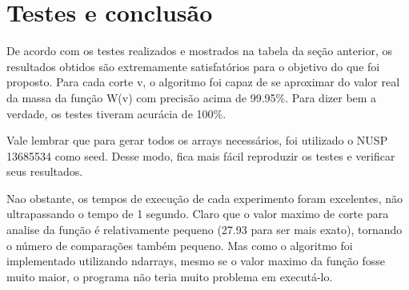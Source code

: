\documentclass{article}
\begin{document}
    \section{Testes e conclusão}

    De acordo com os testes realizados e mostrados na tabela da seção anterior, os resultados obtidos são extremamente satisfatórios para o objetivo do que foi proposto. Para cada corte v, o algoritmo foi capaz de se aproximar do valor real da massa da função W(v) com precisão acima de 99.95\%. Para dizer bem a verdade, os testes tiveram acurácia de 100\%.

    Vale lembrar que para gerar todos os arrays necessários, foi utilizado o NUSP 13685534 como seed. Desse modo, fica mais fácil reproduzir os testes e verificar seus resultados.

    Nao obstante, os tempos de execução de cada experimento foram excelentes, não ultrapassando o tempo de 1 segundo. Claro que o valor maximo de corte para analise da função é relativamente pequeno (27.93 para ser mais exato), tornando o número de comparações também pequeno. Mas como o algoritmo foi implementado utilizando ndarrays, mesmo se o valor maximo da função fosse muito maior, o programa não teria muito problema em executá-lo.
\end{document}
